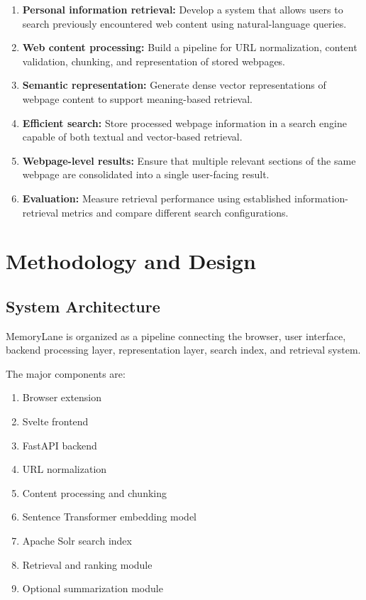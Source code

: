\documentclass{tietreport}
\begin{document}
\begin{enumerate}

    \item \textbf{Personal information retrieval:}
    Develop a system that allows users to search previously
    encountered web content using natural-language queries.

    \item \textbf{Web content processing:}
    Build a pipeline for URL normalization, content validation,
    chunking, and representation of stored webpages.

    \item \textbf{Semantic representation:}
    Generate dense vector representations of webpage content
    to support meaning-based retrieval.

    \item \textbf{Efficient search:}
    Store processed webpage information in a search engine
    capable of both textual and vector-based retrieval.

    \item \textbf{Webpage-level results:}
    Ensure that multiple relevant sections of the same webpage
    are consolidated into a single user-facing result.

    \item \textbf{Evaluation:}
    Measure retrieval performance using established
    information-retrieval metrics and compare different search
    configurations.

\end{enumerate}


\chapter{Methodology and Design}

\section{System Architecture}

MemoryLane is organized as a pipeline connecting the browser,
user interface, backend processing layer, representation layer,
search index, and retrieval system.

The major components are:

\begin{enumerate}
    \item Browser extension
    \item Svelte frontend
    \item FastAPI backend
    \item URL normalization
    \item Content processing and chunking
    \item Sentence Transformer embedding model
    \item Apache Solr search index
    \item Retrieval and ranking module
    \item Optional summarization module
\end{enumerate}
\end{document}
